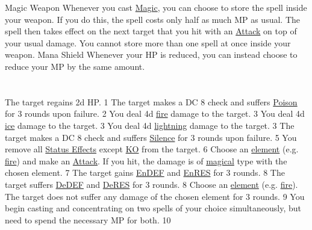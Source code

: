 {Magic Weapon}
{	
	Whenever you cast \hyperlink{action}{Magic}, you can choose to store the spell inside your weapon.
	If you do this, the spell costs only half as much MP as usual.
	The spell then takes effect on the next target that you hit with an \hyperlink{action}{Attack} on top of your usual damage.
	You cannot store more than one spell at once inside your weapon.
}
{Mana Shield}
{	
	Whenever your HP is reduced, you can instead choose to reduce your MP by the same amount.
}
\pagebreak \\
\\\\
{
	The target regains 2d HP. 
}{}{1}
{
	The target makes a DC 8 check and suffers \hyperlink{status}{Poison} for 3 rounds upon failure.
}{\poison}{2}
{
	You deal 4d \hyperlink{type}{fire} damage to the target.
}{\fire}{3}
{
	You deal 4d \hyperlink{type}{ice} damage to the target.
}{\ice}{3}
{
	You deal 4d \hyperlink{type}{lightning} damage to the target.
}{\lightning}{3}
{
	The target makes a DC 8 check and suffers \hyperlink{status}{Silence} for 3 rounds upon failure.
}{\silence}{5}
{
	You remove all \hyperlink{status}{Status Effects} except \hyperlink{status}{KO} from the target.
}{}{6}
{
	Choose an \hyperlink{type}{element} (e.g. \hyperlink{type}{fire}) and make an \hyperlink{action}{Attack}. 
	If you hit, the damage is of \hyperlink{type}{magical} type with the chosen element. 
}{}{7}
{
	The target gains \hyperlink{status}{EnDEF} and \hyperlink{status}{EnRES} for 3 rounds.
}{\enndef \enres}{8}
{
	The target suffers \hyperlink{status}{DeDEF} and \hyperlink{status}{DeRES} for 3 rounds.
}{\dedef \deres}{8}
{
	Choose an \hyperlink{type}{element} (e.g. \hyperlink{type}{fire}). 
	The target does not suffer any damage of the chosen element for 3 rounds.
}{}{9}
{
	You begin casting and concentrating on two spells of your choice simultaneously, but need to spend the necessary MP for both.
}{}{10}
\pagebreak
